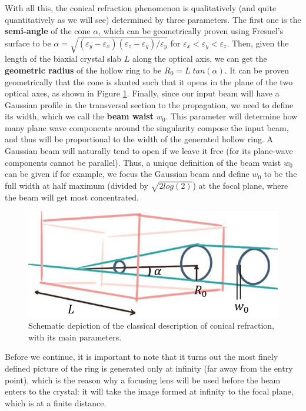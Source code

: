 \documentclass[11pt, a4paper, twoside]{article} %
\begin{document}
With all this, the conical refraction phenomenon is qualitatively (and quite quantitatively as we will see) determined by three parameters. The first one is the {\bf semi-angle} of the cone $\alpha$, which can be geometrically proven using Fresnel's surface to be $\alpha=\sqrt{(\varepsilon_y-\varepsilon_x)(\varepsilon_z-\varepsilon_y)/\varepsilon_y}$ for $\varepsilon_x<\varepsilon_y<\varepsilon_z$. Then, given the length of the biaxial crystal slab $L$ along the optical axis, we can get the {\bf geometric radius} of the hollow ring to be $R_0=L\;tan(\alpha)$. It can be proven geometrically that the cone is slanted such that it opens in the plane of the two optical axes, as shown in Figure \ref{fig:CR}. Finally, since our input beam will have a Gaussian profile in the transversal section to the propagation, we need to define its width, which we call the {\bf beam waist} $w_0$. This parameter will determine how many plane wave components around the singularity compose the input beam, and thus will be proportional to the width of the generated hollow ring. A Gaussian beam will naturally tend to open if we leave it free (for its plane-wave components cannot be parallel). Thus, a unique definition of the beam waist $w_0$ can be given if for example, we focus the Gaussian beam and define $w_0$ to be the full width at half maximum (divided by $\sqrt{2log(2)}$) at the focal plane, where the beam will get most concentrated.

\begin{figure}[h!] 
     \centering 
         \includegraphics[width=0.5\linewidth]{cr.PNG}
    \caption{Schematic depiction of the classical description of conical refraction, with its main parameters.}
    \label{fig:CR}
\end{figure}
Before we continue, it is important to note that it turns out the most finely defined picture of the ring is generated only at infinity (far away from the entry point), which is the reason why a focusing lens will be used before the beam enters to the crystal: it will take the image formed at infinity to the focal plane, which is at a finite distance.

\end{document}
